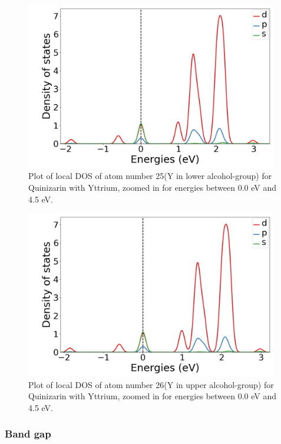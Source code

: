 \documentclass{article}
\begin{document}
      \begin{figure}[H]
        \centering
        \includegraphics[width = 11cm]{../fig/Y_LDOS25_2.png}
        \caption{Plot of local DOS of atom number 25(Y in lower alcohol-group) for Quinizarin with Yttrium, zoomed in for energies between 0.0 eV and 4.5 eV. }
        \label{fig:Y_LDOS25_2}
      \end{figure}

      \begin{figure}[H]
          \centering
          \includegraphics[width = 11cm]{../fig/Y_LDOS26_2.png}
          \caption{Plot of local DOS of atom number 26(Y in upper alcohol-group) for Quinizarin with Yttrium, zoomed in for energies between 0.0 eV and 4.5 eV. }
          \label{fig:Y_LDOS26_2}
      \end{figure}

      \vspace{1cm}

    \subsubsection{Band gap}
\end{document}
